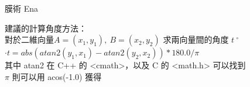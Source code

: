 \begin{problem}{膜術 Ena}
\Examples

\begin{example}
\end{example}

\Note

建議的計算角度方法： \\
對於二維向量$A=(x_1,y_1),\ B=(x_2,y_2)$ 求兩向量間的角度 $t \ ^{\circ}$ \\
$·t = abs( atan2(y_1,x_1) - atan2(y_2,x_2) ) * 180.0 / \pi\ \ $\\
其中 atan2 在 C++ 的 <cmath>，以及 C 的 <math.h> 可以找到\\
$\pi$ 則可以用 acos(-1.0) 獲得
\end{problem}
